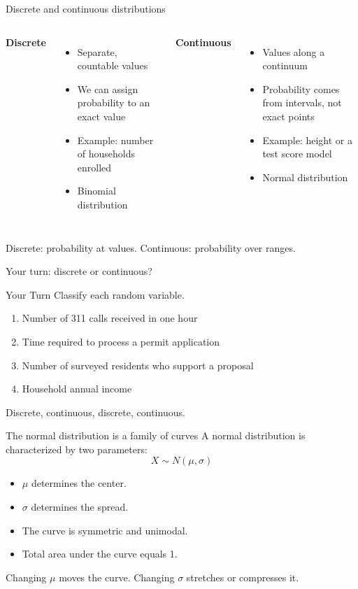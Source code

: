 \documentclass[11pt,aspectratio=169]{beamer}
\newcommand{\yourturn}[1]{%
\begin{center}
\begin{minipage}{0.90\textwidth}
\begin{alertblock}{Your Turn}
#1
\end{alertblock}
\end{minipage}
\end{center}}
\begin{document}
\begin{frame}{Discrete and continuous distributions}
\begin{columns}[T,onlytextwidth]
\textbf{Discrete}
\begin{itemize}
  \item Separate, countable values
  \item We can assign probability to an exact value
  \item Example: number of households enrolled
  \item Binomial distribution
\end{itemize}

\textbf{Continuous}
\begin{itemize}
  \item Values along a continuum
  \item Probability comes from intervals, not exact points
  \item Example: height or a test score model
  \item Normal distribution
\end{itemize}
\end{columns}

\vfill
\alert{Discrete: probability at values. Continuous: probability over ranges.}
\end{frame}

\begin{frame}{Your turn: discrete or continuous?}
\yourturn{Classify each random variable.
\begin{enumerate}
  \item Number of 311 calls received in one hour
  \item Time required to process a permit application
  \item Number of surveyed residents who support a proposal
  \item Household annual income
\end{enumerate}}

\pause
\vfill
\begin{center}
\small Discrete, continuous, discrete, continuous.
\end{center}
\end{frame}

\begin{frame}{The normal distribution is a family of curves}
A normal distribution is characterized by two parameters:
\[
X\sim N(\mu,\sigma)
\]

\begin{itemize}
  \item $\mu$ determines the \alert{center}.
  \item $\sigma$ determines the \alert{spread}.
  \item The curve is symmetric and unimodal.
  \item Total area under the curve equals 1.
\end{itemize}

\vfill
Changing $\mu$ moves the curve. Changing $\sigma$ stretches or compresses it.
\end{frame}
\end{document}
